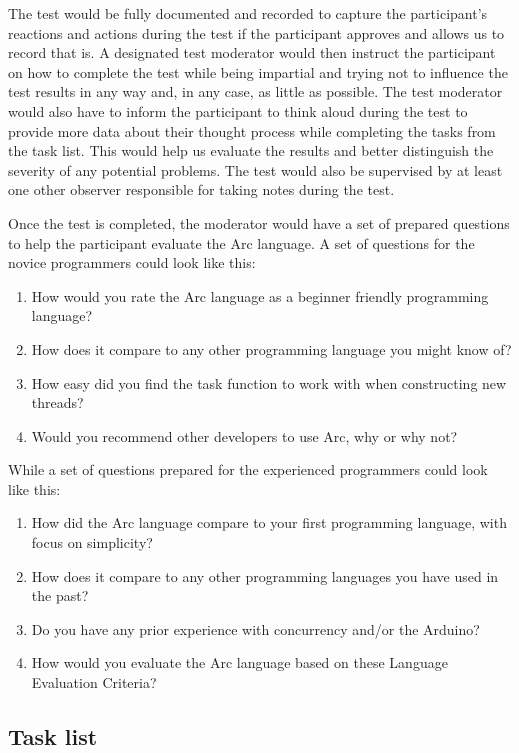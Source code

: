 The test would be fully documented and recorded to capture the participant's reactions and actions during the test if the participant approves and allows us to record that is. A designated test moderator would then instruct the participant on how to complete the test while being impartial and trying not to influence the test results in any way and, in any case, as little as possible. The test moderator would also have to inform the participant to think aloud during the test to provide more data about their thought process while completing the tasks from the task list. This would help us evaluate the results and better distinguish the severity of any potential problems. The test would also be supervised by at least one other observer responsible for taking notes during the test.

Once the test is completed, the moderator would have a set of prepared questions to help the participant evaluate the Arc language. A set of questions for the novice programmers could look like this:

\begin{enumerate}
    \item How would you rate the Arc language as a beginner friendly programming language?
    \item How does it compare to any other programming language you might know of?
    \item How easy did you find the task function to work with when constructing new threads?
    \item Would you recommend other developers to use Arc, why or why not?
\end{enumerate}

While a set of questions prepared for the experienced programmers could look like this:

\begin{enumerate}
    \item How did the Arc language compare to your first programming language, with focus on simplicity?
    \item How does it compare to any other programming languages you have used in the past?
    \item Do you have any prior experience with concurrency and/or the Arduino?
    \item How would you evaluate the Arc language based on these Language Evaluation Criteria?
\end{enumerate}

\subsection{Task list}\label{subsubsec:taskList}

